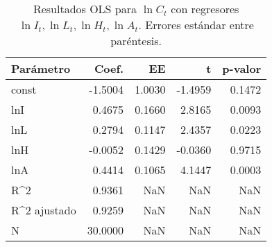 \begin{table}
\caption{Resultados OLS para $\ln C_t$ con regresores $\ln I_t, \ln L_t, \ln H_t, \ln A_t$. Errores estándar entre paréntesis.}
\label{tab:q7_a}
\begin{tabular}{lrrrr}
\toprule
Parámetro & Coef. & EE & t & p-valor \\
\midrule
const & -1.5004 & 1.0030 & -1.4959 & 0.1472 \\
lnI & 0.4675 & 0.1660 & 2.8165 & 0.0093 \\
lnL & 0.2794 & 0.1147 & 2.4357 & 0.0223 \\
lnH & -0.0052 & 0.1429 & -0.0360 & 0.9715 \\
lnA & 0.4414 & 0.1065 & 4.1447 & 0.0003 \\
R^2 & 0.9361 & NaN & NaN & NaN \\
R^2 ajustado & 0.9259 & NaN & NaN & NaN \\
N & 30.0000 & NaN & NaN & NaN \\
\bottomrule
\end{tabular}
\end{table}
